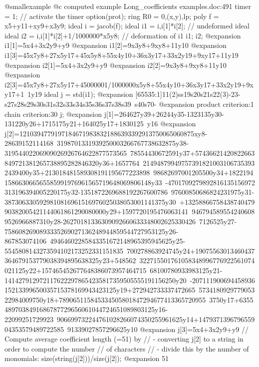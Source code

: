 @smallexample
@c computed example Long_coefficients examples.doc:491 
timer = 1;                              // activate the timer
option(prot);
ring R0 = 0,(x,y),lp;
poly f = x5+y11+xy9+x3y9;
ideal i = jacob(f);
ideal i1 = i,i[1]*i[2];                 // undeformed ideal
ideal i2 = i,i[1]*i[2]+1/1000000*x5y8;  // deformation of i1
i1; i2;
@expansion{} i1[1]=5x4+3x2y9+y9
@expansion{} i1[2]=9x3y8+9xy8+11y10
@expansion{} i1[3]=45x7y8+27x5y17+45x5y8+55x4y10+36x3y17+33x2y19+9xy17+11y19
@expansion{} i2[1]=5x4+3x2y9+y9
@expansion{} i2[2]=9x3y8+9xy8+11y10
@expansion{} i2[3]=45x7y8+27x5y17+45000001/1000000x5y8+55x4y10+36x3y17+33x2y19+9xy17+1\
   1y19
ideal j = std(i1);
@expansion{} [65535:1]11(2)ss19s20s21s22(3)-23-s27s28s29s30s31s32s33s34s35s36s37s38s39\
   s40s70-
@expansion{} product criterion:1 chain criterion:30
j;
@expansion{} j[1]=264627y39+26244y35-1323135y30-131220y26+1715175y21+164025y17+1830125\
   y16
@expansion{} j[2]=12103947791971846719838321886393392913750065060875xy8-28639152114168\
   3198701331939250003266767738632875y38-31954402206909026926764622877573565\
   78554430672591y37+57436621420822663849721381265738895282846320y36+1657764\
   214948799497573918210031067353932439400y35+213018481589308191195677223898\
   98682697001205500y34+1822194158663066565585991976961565719648069806148y33\
   -4701709279892816135156972313196394005220175y32-1351872269688192267600786\
   97600850686824231975y31-3873063305929810816961516976025038053001141375y30\
   +1325886675843874047990382005421144061861290080000y29+1597720195476063141\
   9467945895542406089526966887310y28-26270181336309092660633348002625330426\
   7126525y27-7586082690893335269027136248944859544727953125y26-867853074106\
   49464602285843351672148965395945625y25-5545808143273594102173252331151835\
   700278863924745y24+19075563013460437364679153779038394895638325y23+548562\
   322715501761058348996776922561074021125y22+157465452677648386073957464715\
   68100780933983125y21-1414279129721176222978654235817359505555191156250y20\
   -20711190069445893615213399650035715378169943423125y19+272942733337472665\
   573418092977905322984009750y18+789065115845334505801847294677413365720955\
   3750y17+63554897038491686787729656061044724651089803125y16-22099251729923\
   906699732244761028266074350255961625y14+147937139679655904353579489722585\
   91339027857296625y10
@expansion{} j[3]=5x4+3x2y9+y9
// Compute average coefficient length (=51) by
//   - converting j[2] to a string in order to compute the number
//   of characters
//   - divide this by the number of monomials:
size(string(j[2]))/size(j[2]);
@expansion{} 51
